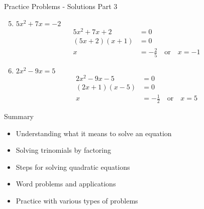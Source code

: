 \documentclass[aspectratio=169]{beamer}
\begin{document}
\begin{frame}{Practice Problems - Solutions Part 3}
    \begin{tcolorbox}[colback=lightgray,colframe=accent,title=Detailed Solutions]
        \footnotesize
        \begin{enumerate}
            \setcounter{enumi}{4}
            \setlength{\itemsep}{0.5em}
            \item $5x^2 + 7x = -2$
            \begin{align*}
                5x^2 + 7x + 2 &= 0 \\
                (5x + 2)(x + 1) &= 0 \\
                x &= -\frac{2}{5} \quad \text{or} \quad x = -1
            \end{align*}
            
            \item $2x^2 - 9x = 5$
            \begin{align*}
                2x^2 - 9x - 5 &= 0 \\
                (2x + 1)(x - 5) &= 0 \\
                x &= -\frac{1}{2} \quad \text{or} \quad x = 5
            \end{align*}
        \end{enumerate}
    \end{tcolorbox}
\end{frame}

\begin{frame}{Summary}
    \begin{tcolorbox}[colback=lightgray,colframe=primary,title=Key Concepts]
        \footnotesize
        \begin{itemize}
            \item Understanding what it means to solve an equation
            \item Solving trinomials by factoring
            \item Steps for solving quadratic equations
            \item Word problems and applications
            \item Practice with various types of problems
        \end{itemize}
    \end{tcolorbox}
\end{frame}
\end{document}
